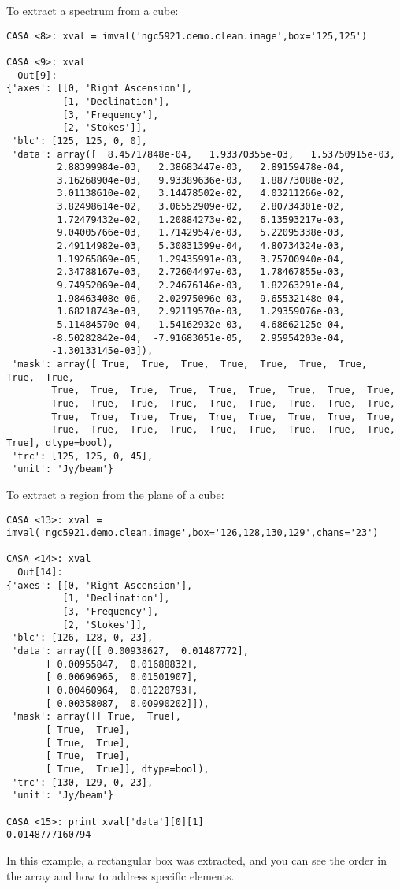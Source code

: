 To extract a spectrum from a cube:
\small
\begin{verbatim}
CASA <8>: xval = imval('ngc5921.demo.clean.image',box='125,125')

CASA <9>: xval
  Out[9]: 
{'axes': [[0, 'Right Ascension'],
          [1, 'Declination'],
          [3, 'Frequency'],
          [2, 'Stokes']],
 'blc': [125, 125, 0, 0],
 'data': array([  8.45717848e-04,   1.93370355e-03,   1.53750915e-03,
         2.88399984e-03,   2.38683447e-03,   2.89159478e-04,
         3.16268904e-03,   9.93389636e-03,   1.88773088e-02,
         3.01138610e-02,   3.14478502e-02,   4.03211266e-02,
         3.82498614e-02,   3.06552909e-02,   2.80734301e-02,
         1.72479432e-02,   1.20884273e-02,   6.13593217e-03,
         9.04005766e-03,   1.71429547e-03,   5.22095338e-03,
         2.49114982e-03,   5.30831399e-04,   4.80734324e-03,
         1.19265869e-05,   1.29435991e-03,   3.75700940e-04,
         2.34788167e-03,   2.72604497e-03,   1.78467855e-03,
         9.74952069e-04,   2.24676146e-03,   1.82263291e-04,
         1.98463408e-06,   2.02975096e-03,   9.65532148e-04,
         1.68218743e-03,   2.92119570e-03,   1.29359076e-03,
        -5.11484570e-04,   1.54162932e-03,   4.68662125e-04,
        -8.50282842e-04,  -7.91683051e-05,   2.95954203e-04,
        -1.30133145e-03]),
 'mask': array([ True,  True,  True,  True,  True,  True,  True,  True,  True,
        True,  True,  True,  True,  True,  True,  True,  True,  True,
        True,  True,  True,  True,  True,  True,  True,  True,  True,
        True,  True,  True,  True,  True,  True,  True,  True,  True,
        True,  True,  True,  True,  True,  True,  True,  True,  True,  True], dtype=bool),
 'trc': [125, 125, 0, 45],
 'unit': 'Jy/beam'}
\end{verbatim}
\normalsize

To extract a region from the plane of a cube:
\small
\begin{verbatim}
CASA <13>: xval = imval('ngc5921.demo.clean.image',box='126,128,130,129',chans='23')

CASA <14>: xval
  Out[14]: 
{'axes': [[0, 'Right Ascension'],
          [1, 'Declination'],
          [3, 'Frequency'],
          [2, 'Stokes']],
 'blc': [126, 128, 0, 23],
 'data': array([[ 0.00938627,  0.01487772],
       [ 0.00955847,  0.01688832],
       [ 0.00696965,  0.01501907],
       [ 0.00460964,  0.01220793],
       [ 0.00358087,  0.00990202]]),
 'mask': array([[ True,  True],
       [ True,  True],
       [ True,  True],
       [ True,  True],
       [ True,  True]], dtype=bool),
 'trc': [130, 129, 0, 23],
 'unit': 'Jy/beam'}

CASA <15>: print xval['data'][0][1]
0.0148777160794
\end{verbatim}
\normalsize
In this example, a rectangular box was extracted, and you can see the
order in the array and how to address specific elements.

